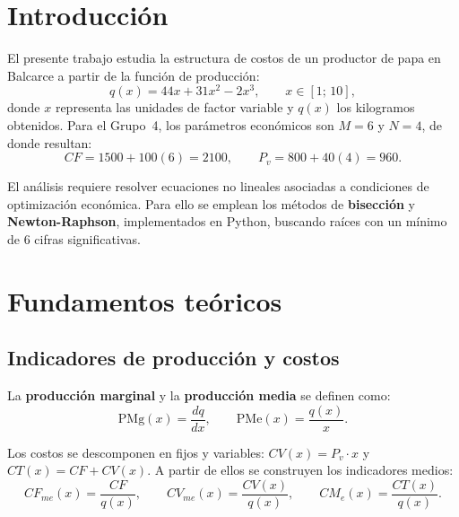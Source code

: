 
\section{Introducción}

El presente trabajo estudia la estructura de costos de un productor de papa en Balcarce a partir de la función de producción:
\begin{equation}
    q(x) = 44x + 31x^2 - 2x^3, \qquad x \in [1;\,10],
    \label{eq:produccion}
\end{equation}
donde $x$ representa las unidades de factor variable y $q(x)$ los kilogramos obtenidos. Para el Grupo~4, los parámetros económicos son $M=6$ y $N=4$, de donde resultan:
\begin{equation}
    CF = 1500 + 100(6) = 2100, \qquad P_v = 800 + 40(4) = 960.
\end{equation}

El análisis requiere resolver ecuaciones no lineales asociadas a condiciones de optimización económica. Para ello se emplean los métodos de \textbf{bisección} y \textbf{Newton-Raphson}, implementados en Python, buscando raíces con un mínimo de 6 cifras significativas.

\section{Fundamentos teóricos}

\subsection{Indicadores de producción y costos}

La \textbf{producción marginal} y la \textbf{producción media} se definen como:
\begin{equation}
    \text{PMg}(x) = \frac{dq}{dx}, \qquad \text{PMe}(x) = \frac{q(x)}{x}.
\end{equation}

Los costos se descomponen en fijos y variables: $CV(x) = P_v \cdot x$ y $CT(x) = CF + CV(x)$. A partir de ellos se construyen los indicadores medios:
\begin{equation}
    CF_{me}(x) = \frac{CF}{q(x)}, \qquad
    CV_{me}(x) = \frac{CV(x)}{q(x)}, \qquad
    CM_e(x)    = \frac{CT(x)}{q(x)}.
\end{equation}

